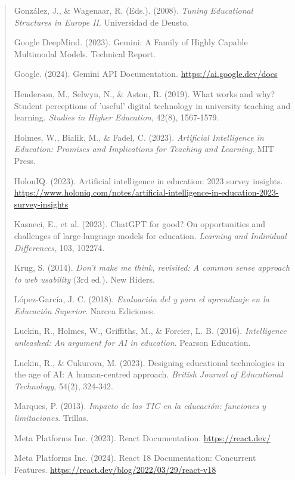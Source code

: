 \documentclass[12pt,a4paper]{report}
\begin{document}
\begin{quote}
\begin{thebibliography}{99}
González, J., \& Wagenaar, R. (Eds.). (2008). \textit{Tuning Educational Structures in Europe II}. Universidad de Deusto.

Google DeepMind. (2023). Gemini: A Family of Highly Capable Multimodal Models. Technical Report.

Google. (2024). Gemini API Documentation. \url{https://ai.google.dev/docs}

Henderson, M., Selwyn, N., \& Aston, R. (2019). What works and why? Student perceptions of 'useful' digital technology in university teaching and learning. \textit{Studies in Higher Education}, 42(8), 1567-1579.

Holmes, W., Bialik, M., \& Fadel, C. (2023). \textit{Artificial Intelligence in Education: Promises and Implications for Teaching and Learning}. MIT Press.

HolonIQ. (2023). Artificial intelligence in education: 2023 survey insights. \url{https://www.holoniq.com/notes/artificial-intelligence-in-education-2023-survey-insights}

Kasneci, E., et al. (2023). ChatGPT for good? On opportunities and challenges of large language models for education. \textit{Learning and Individual Differences}, 103, 102274.

Krug, S. (2014). \textit{Don't make me think, revisited: A common sense approach to web usability} (3rd ed.). New Riders.

López-García, J. C. (2018). \textit{Evaluación del y para el aprendizaje en la Educación Superior}. Narcea Ediciones.

Luckin, R., Holmes, W., Griffiths, M., \& Forcier, L. B. (2016). \textit{Intelligence unleashed: An argument for AI in education}. Pearson Education.

Luckin, R., \& Cukurova, M. (2023). Designing educational technologies in the age of AI: A human-centred approach. \textit{British Journal of Educational Technology}, 54(2), 324-342.

Marques, P. (2013). \textit{Impacto de las TIC en la educación: funciones y limitaciones}. Trillas.

Meta Platforms Inc. (2023). React Documentation. \url{https://react.dev/}

Meta Platforms Inc. (2024). React 18 Documentation: Concurrent Features. \url{https://react.dev/blog/2022/03/29/react-v18}


\end{thebibliography}
\end{quote}
\end{document}

